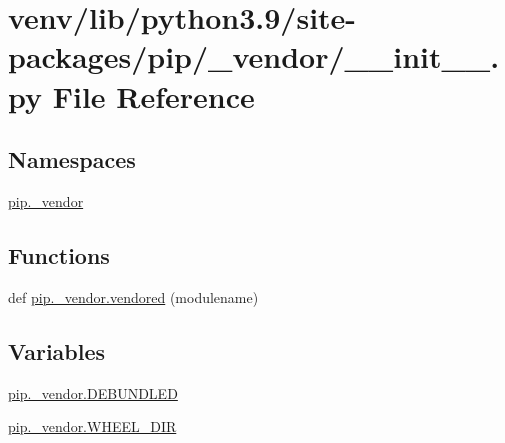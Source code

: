\hypertarget{venv_2lib_2python3_89_2site-packages_2pip_2__vendor_2____init_____8py}{}\section{venv/lib/python3.9/site-\/packages/pip/\+\_\+vendor/\+\_\+\+\_\+init\+\_\+\+\_\+.py File Reference}
\label{venv_2lib_2python3_89_2site-packages_2pip_2__vendor_2____init_____8py}
\subsection*{Namespaces}
\begin{DoxyCompactItemize}
\item 
 \hyperlink{namespacepip_1_1__vendor}{pip.\+\_\+vendor}
\end{DoxyCompactItemize}
\subsection*{Functions}
\begin{DoxyCompactItemize}
\item 
def \hyperlink{namespacepip_1_1__vendor_a60bedf38e7943004f5ab2d148356e890}{pip.\+\_\+vendor.\+vendored} (modulename)
\end{DoxyCompactItemize}
\subsection*{Variables}
\begin{DoxyCompactItemize}
\item 
\hyperlink{namespacepip_1_1__vendor_ac246b01584aac7bd75b56f0666ff97b8}{pip.\+\_\+vendor.\+D\+E\+B\+U\+N\+D\+L\+ED}
\item 
\hyperlink{namespacepip_1_1__vendor_af8bd31398248323cdf81be83bf416c4b}{pip.\+\_\+vendor.\+W\+H\+E\+E\+L\+\_\+\+D\+IR}
\end{DoxyCompactItemize}

